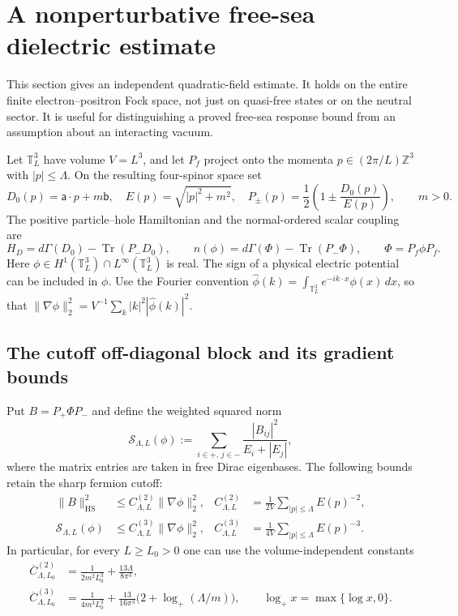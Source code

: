 \section{A nonperturbative free-sea dielectric estimate}
\label{fd-section}

This section gives an independent quadratic-field estimate.  It holds on
the entire finite electron--positron Fock space, not just on quasi-free
states or on the neutral sector.  It is useful for distinguishing a proved
free-sea response bound from an assumption about an interacting vacuum.

Let $\mathbb T_L^3$ have volume $V=L^3$, and let $P_f$ project onto the
momenta $p\in(2\pi/L)\mathbb Z^3$ with $|p|\le\Lambda$.  On the resulting
four-spinor space set
\[
 D_0(p)=\boldsymbol{\mathsf a}\cdot p+m\mathsf b,
 \quad E(p)=\sqrt{|p|^2+m^2},\quad
 P_\pm(p)=\frac12\left(1\pm\frac{D_0(p)}{E(p)}\right),\qquad m>0.
\]
The positive particle--hole Hamiltonian and the normal-ordered scalar
coupling are
\[
 H_D=d\Gamma(D_0)-\operatorname{Tr}(P_-D_0),\qquad
 n(\phi)=d\Gamma(\Phi)-\operatorname{Tr}(P_-\Phi),\qquad
 \Phi=P_f\phi P_f.
\]
Here $\phi\in H^1(\mathbb T_L^3)\cap L^\infty(\mathbb T_L^3)$ is real.
The sign of a physical electric potential can be included in $\phi$.
Use the Fourier convention
$\widehat\phi(k)=\int_{\mathbb T_L^3}e^{-ik\cdot x}\phi(x)\,dx$, so that
$\|\nabla\phi\|_2^2=V^{-1}\sum_k|k|^2|\widehat\phi(k)|^2$.

\subsection{The cutoff off-diagonal block and its gradient bounds}

Put $B=P_+\Phi P_-$ and define the weighted squared norm
\begin{equation}
 \mathcal S_{\Lambda,L}(\phi)
 :=\sum_{i\in+,\,j\in-}
       \frac{|B_{ij}|^2}{E_i+|E_j|},
 \label{fd-weighted-norm}
\end{equation}
where the matrix entries are taken in free Dirac eigenbases.  The following
bounds retain the sharp fermion cutoff:
\begin{align}
 \|B\|_{\mathrm{HS}}^2
 &\le C^{(2)}_{\Lambda,L}\|\nabla\phi\|_2^2,
 &C^{(2)}_{\Lambda,L}
 &=\frac1{2V}\sum_{|p|\le\Lambda}E(p)^{-2},
 \label{fd-hs-bound}\\
 \mathcal S_{\Lambda,L}(\phi)
 &\le C^{(3)}_{\Lambda,L}\|\nabla\phi\|_2^2,
 &C^{(3)}_{\Lambda,L}
 &=\frac1{4V}\sum_{|p|\le\Lambda}E(p)^{-3}.
 \label{fd-weighted-bound}
\end{align}
In particular, for every $L\ge L_0>0$ one can use the volume-independent
constants
\begin{align}
 \overline C^{(2)}_{\Lambda,L_0}
 &=\frac1{2m^2L_0^3}+\frac{13\Lambda}{8\pi^3},
 \label{fd-c2}\\
 \overline C^{(3)}_{\Lambda,L_0}
 &=\frac1{4m^3L_0^3}
       +\frac{13}{16\pi^3}\bigl(2+\log_+(\Lambda/m)\bigr),
 \qquad\log_+x=\max\{\log x,0\}.
 \label{fd-c3}
\end{align}

